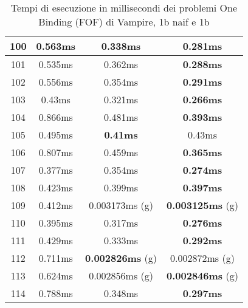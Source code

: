 \begin{table}[H]
\begin{minipage}{5cm}
{\begin{tabular}{|c|c|c|c|}
\hline
100 & 0.563ms & 0.338ms & \textbf{0.281ms} \\
\hline
101 & 0.535ms & 0.362ms & \textbf{0.288ms} \\
\hline
102 & 0.556ms & 0.354ms & \textbf{0.291ms} \\
\hline
103 & 0.43ms & 0.321ms & \textbf{0.266ms} \\
\hline
104 & 0.866ms & 0.481ms & \textbf{0.393ms} \\
\hline
105 & 0.495ms & \textbf{0.41ms} & 0.43ms \\
\hline
106 & 0.807ms & 0.459ms & \textbf{0.365ms} \\
\hline
107 & 0.377ms & 0.354ms & \textbf{0.274ms} \\
\hline
108 & 0.423ms & 0.399ms & \textbf{0.397ms} \\
\hline
109 & 0.412ms & 0.003173ms (g) & \textbf{0.003125ms} (g) \\
\hline
110 & 0.395ms & 0.317ms & \textbf{0.276ms} \\
\hline
111 & 0.429ms & 0.333ms & \textbf{0.292ms} \\
\hline
112 & 0.711ms & \textbf{0.002826ms} (g) & 0.002872ms (g) \\
\hline
113 & 0.624ms & 0.002856ms (g) & \textbf{0.002846ms} (g) \\
\hline
114 & 0.788ms & 0.348ms & \textbf{0.297ms} \\
\hline
\end{tabular}
}
\end{minipage}
\caption{Tempi di esecuzione in millisecondi dei problemi One Binding (FOF) di Vampire, 1b naif e 1b}
\end{table}
